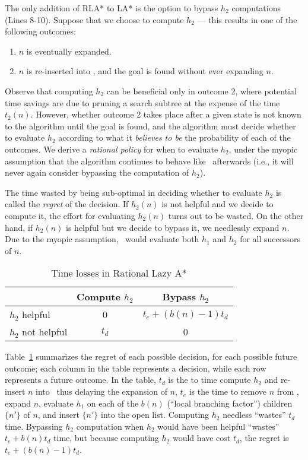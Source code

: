 The only addition of RLA* to LA* is the option to bypass $h_2$ computations (Lines 8-10).
Suppose that we choose to compute $h_2$ --- this results in one of the
following outcomes:
\begin{enumerate}
\item $n$ is eventually expanded.
\item $n$ is re-inserted into \OPEN, and the goal is found without ever expanding $n$.
\end{enumerate}

Observe that computing $h_2$ can be beneficial only in outcome 2, where
potential time savings are due to pruning a search subtree at the expense of
the time $t_2(n)$. However, whether outcome 2 takes place after a given state
is not known to the algorithm until the goal is found, and the algorithm must
decide whether to evaluate $h_2$ according to what it \textit{believes to be}
the probability of each of the outcomes. We derive a \textit{rational policy}
for when to evaluate $h_2$, under the myopic assumption that the algorithm
continues to behave like \lazyastar~afterwards (i.e., it will never again
consider bypassing the computation of $h_2$).

The time wasted by being sub-optimal in deciding whether to evaluate $h_2$ is
called the {\em regret} of the decision. If $h_2(n)$ is not helpful and we decide to compute it, the effort for evaluating $h_2(n)$ turns out to be wasted. On the other hand, if $h_2(n)$ is helpful but we decide to bypass it, we needlessly expand $n$. Due to the myopic assumption, \rationallazyastar~would evaluate both $h_1$ and $h_2$ for all successors of
$n$.

\begin{table}[h!]
\begin{center}
\begin{tabular}{|l|c|c|}
\hline
               & Compute $h_2$ & Bypass $h_2$\\
\hline
$h_2$ helpful &   0            & $t_e+(b(n)-1)t_d$\\
\hline
$h_2$ not helpful & $t_d$      & 0 \\
\hline
\end{tabular}
\end{center}
\caption{Time losses in Rational Lazy A*}
\label{tbl:rla-rational-lazy-a-time}
\end{table}

Table~\ref{tbl:rla-rational-lazy-a-time}
summarizes the regret of each possible decision, for each possible future
outcome; each column in the table represents a decision, while each row
represents a future outcome.
In the table, $t_d$ is the to time compute $h_2$ and re-insert $n$ into
\OPEN~thus delaying the expansion of $n$, $t_e$ is the time to remove $n$ from \OPEN,
expand $n$, evaluate $h_1$ on each of the $b(n)$ (``local branching factor'')
children $\{n'\}$ of $n$, and insert $\{n'\}$ into the open list.
Computing $h_2$ needless ``wastes'' $t_d$ time.
Bypassing $h_2$ computation when $h_2$ would have been helpful ``wastes''
$t_e+b(n)t_d$ time, but because computing $h_2$ would have cost $t_d$, the
regret is $t_e+(b(n)-1)t_d$.

